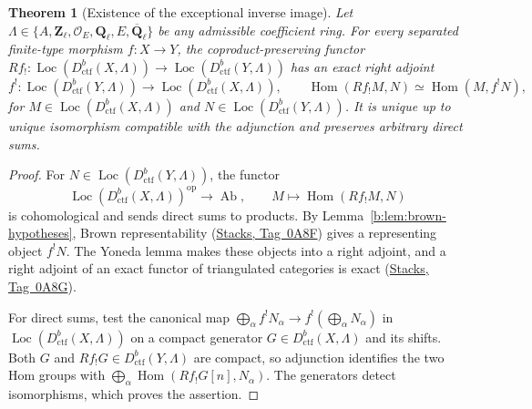 \documentclass[11pt,a4paper]{article}
\numberwithin{equation}{section}
\newtheorem{theorem}{Theorem}[section]
\theoremstyle{definition}
\theoremstyle{remark}
\newcommand{\Loc}{\operatorname{Loc}}
\newcommand{\Qbar}{\overline{\mathbf Q}_\ell}
\newcommand{\Ql}{\mathbf Q_\ell}
\newcommand{\Zl}{\mathbf Z_\ell}
\newcommand{\stacks}[1]{\href{https://stacks.math.columbia.edu/tag/#1}{\textnormal{Stacks, Tag~#1}}}
\newcommand{\Ab}{\operatorname{Ab}}
\newcommand{\Hom}{\operatorname{Hom}}
\newcommand{\Dctf}{D^b_{\mathrm{ctf}}}
\begin{document}
\begin{theorem}[Existence of the exceptional inverse image]
\label{b:thm:brown-adjoint}\label{ctf:unified-brown}
Let $\Lambda\in\{A,\Zl,\mathcal O_E,\Ql,E,\Qbar\}$ be any admissible
coefficient ring. For every separated finite-type morphism $f:X\to Y$,
the coproduct-preserving functor
$Rf_!:\Loc(\Dctf(X,\Lambda))\to\Loc(\Dctf(Y,\Lambda))$ has an exact
right adjoint
\[
 f^!:\Loc(\Dctf(Y,\Lambda))\longrightarrow\Loc(\Dctf(X,\Lambda)),
 \qquad
 \Hom(Rf_!M,N)\simeq\Hom(M,f^!N),
\]
for $M\in\Loc(\Dctf(X,\Lambda))$ and $N\in\Loc(\Dctf(Y,\Lambda))$.
It is unique up to unique isomorphism compatible with the adjunction
and preserves arbitrary direct sums.
\end{theorem}
\begin{proof}
For $N\in\Loc(\Dctf(Y,\Lambda))$, the functor
\[
 \Loc(\Dctf(X,\Lambda))^{\mathrm{op}}\longrightarrow\Ab,
 \qquad M\longmapsto\Hom(Rf_!M,N)
\]
is cohomological and sends direct sums to products. By
Lemma~\ref{b:lem:brown-hypotheses}, Brown representability
(\stacks{0A8F}) gives a representing object $f^!N$. The Yoneda lemma
makes these objects into a right adjoint, and a right adjoint of an
exact functor of triangulated categories is exact (\stacks{0A8G}).

For direct sums, test the canonical map
$\bigoplus_\alpha f^!N_\alpha\to f^!(\bigoplus_\alpha N_\alpha)$
in $\Loc(\Dctf(X,\Lambda))$ on a compact generator $G\in\Dctf(X,\Lambda)$ and its shifts.
Both $G$ and $Rf_!G\in\Dctf(Y,\Lambda)$ are compact, so adjunction
identifies the two Hom groups with
$\bigoplus_\alpha\Hom(Rf_!G[n],N_\alpha)$. The generators detect
isomorphisms, which proves the assertion.
\end{proof}
\end{document}
